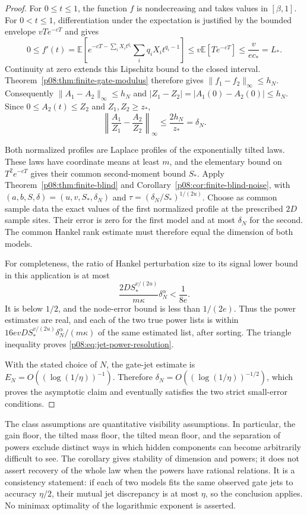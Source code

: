 \documentclass[11pt,letterpaper]{article}
\theoremstyle{definition}
\theoremstyle{remark}
\newcommand{\1}{\mathbf 1}
\begin{document}
\begin{proof}
For $0\leq t\leq1$, the function $f$ is nondecreasing and takes values
in $[\beta,1]$.  For $0<t\leq1$, differentiation under the expectation
is justified by the bounded envelope $vT e^{-cT}$ and gives
\[
 0\leq f'(t)
 =\mathbb E\left[e^{-cT-\sum_iX_it^{q_i}}
                   \sum_iq_iX_it^{q_i-1}\right]
 \leq v\mathbb E[T e^{-cT}]\leq\frac{v}{ec_*}=L_*.
\]
Continuity at zero extends this Lipschitz bound to the closed interval.
Theorem~\ref{p08:thm:finite-gate-modulus} therefore gives
$\|f_1-f_2\|_\infty\leq h_N$.
Consequently $\|A_1-A_2\|_\infty\leq h_N$ and
$|Z_1-Z_2|=|A_1(0)-A_2(0)|\leq h_N$.
Since $0\leq A_2(t)\leq Z_2$ and $Z_1,Z_2\geq z_*$,
\[
 \left\|\frac{A_1}{Z_1}-\frac{A_2}{Z_2}\right\|_\infty
 \leq\frac{2h_N}{z_*}=\delta_N.
\]

Both normalized profiles are Laplace profiles of the exponentially tilted
laws.  These laws have coordinate means at least $m$, and the elementary
bound on $T^2e^{-cT}$ gives their common second-moment bound $S_*$.
Apply Theorem~\ref{p08:thm:finite-blind} and
Corollary~\ref{p08:cor:finite-blind-noise}, with
$(a,b,S,\delta)=(u,v,S_*,\delta_N)$ and
$\tau=(\delta_N/S_*)^{1/(2u)}$.
Choose as common sample data the exact values of the first normalized
profile at the prescribed $2D$ sample sites.  Their error is zero for the
first model and at most $\delta_N$ for the second.
The common Hankel rank estimate must therefore equal the dimension of
both models.

For completeness, the ratio of Hankel perturbation size to its signal
lower bound in this application is at most
\[
 \frac{2D S_*^{v/(2u)}}{m\kappa}\delta_N^\alpha<\frac1{8e}.
\]
It is below $1/2$, and the node-error bound is less than $1/(2e)$.
Thus the power estimates are real, and each of the two true power lists
is within
$16evD S_*^{v/(2u)}\delta_N^\alpha/(m\kappa)$ of the same estimated
list, after sorting.  The triangle inequality proves
\eqref{p08:eq:jet-power-resolution}.

With the stated choice of $N$, the gate-jet estimate is
$E_N=O((\log(1/\eta))^{-1})$.  Therefore
$\delta_N=O((\log(1/\eta))^{-1/2})$, which proves the asymptotic
claim and eventually satisfies the two strict small-error conditions.
\end{proof}

The class assumptions are quantitative visibility assumptions.  In
particular, the gain floor, the tilted mass floor, the tilted mean floor,
and the separation of powers exclude distinct ways in which hidden
components can become arbitrarily difficult to see.  The corollary gives
stability of dimension and powers; it does not assert recovery of the
whole law when the powers have rational relations.  It is a consistency
statement: if each of two models fits the same observed gate jets to
accuracy $\eta/2$, their mutual jet discrepancy is at most $\eta$, so the
conclusion applies.  No minimax optimality of the logarithmic exponent
is asserted.
\end{document}
